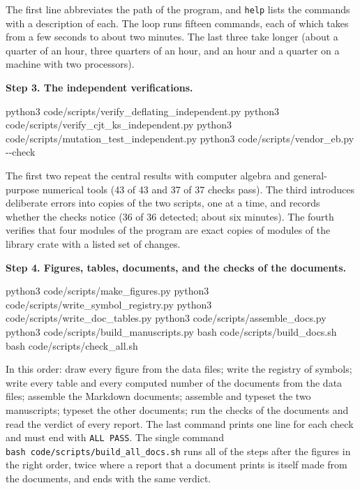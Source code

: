 \documentclass[
  10pt,
]{article}
\newenvironment{Shaded}{}{}
\newcommand{\AttributeTok}[1]{\textcolor[rgb]{0.49,0.56,0.16}{#1}}
\newcommand{\ExtensionTok}[1]{#1}
\newcommand{\FunctionTok}[1]{\textcolor[rgb]{0.02,0.16,0.49}{#1}}
\newcommand{\NormalTok}[1]{#1}
\begin{document}
The first line abbreviates the path of the program, and \texttt{help}
lists the commands with a description of each. The loop runs fifteen
commands, each of which takes from a few seconds to about two minutes.
The last three take longer (about a quarter of an hour, three quarters
of an hour, and an hour and a quarter on a machine with two processors).

\textbf{Step 3. The independent verifications.}

\begin{Shaded}
\begin{Highlighting}[]
\ExtensionTok{python3}\NormalTok{ code/scripts/verify\_deflating\_independent.py}
\ExtensionTok{python3}\NormalTok{ code/scripts/verify\_cjt\_ks\_independent.py}
\ExtensionTok{python3}\NormalTok{ code/scripts/mutation\_test\_independent.py}
\ExtensionTok{python3}\NormalTok{ code/scripts/vendor\_eb.py }\AttributeTok{{-}{-}check}
\end{Highlighting}
\end{Shaded}

The first two repeat the central results with computer algebra and
general-purpose numerical tools (43 of 43 and 37 of 37 checks pass). The
third introduces deliberate errors into copies of the two scripts, one
at a time, and records whether the checks notice (36 of 36 detected;
about six minutes). The fourth verifies that four modules of the program
are exact copies of modules of the library crate with a listed set of
changes.

\textbf{Step 4. Figures, tables, documents, and the checks of the
documents.}

\begin{Shaded}
\begin{Highlighting}[]
\ExtensionTok{python3}\NormalTok{ code/scripts/make\_figures.py}
\ExtensionTok{python3}\NormalTok{ code/scripts/write\_symbol\_registry.py}
\ExtensionTok{python3}\NormalTok{ code/scripts/write\_doc\_tables.py}
\ExtensionTok{python3}\NormalTok{ code/scripts/assemble\_docs.py}
\ExtensionTok{python3}\NormalTok{ code/scripts/build\_manuscripts.py}
\FunctionTok{bash}\NormalTok{    code/scripts/build\_docs.sh}
\FunctionTok{bash}\NormalTok{    code/scripts/check\_all.sh}
\end{Highlighting}
\end{Shaded}

In this order: draw every figure from the data files; write the registry
of symbols; write every table and every computed number of the documents
from the data files; assemble the Markdown documents; assemble and
typeset the two manuscripts; typeset the other documents; run the checks
of the documents and read the verdict of every report. The last command
prints one line for each check and must end with \texttt{ALL\ PASS}. The
single command \texttt{bash\ code/scripts/build\_all\_docs.sh} runs all
of the steps after the figures in the right order, twice where a report
that a document prints is itself made from the documents, and ends with
the same verdict.
\end{document}
